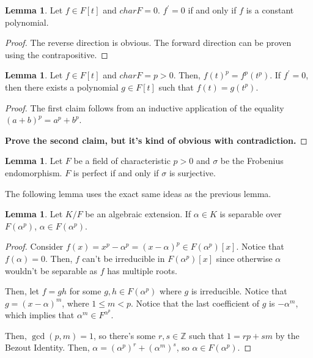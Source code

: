 \documentclass{article}
\theoremstyle{definition}
\newtheorem{lemma}[theorem]{Lemma}
\newcommand{\Z}{\mathbb{Z}}
\begin{document}
\begin{lemma}
    Let $f \in F[t]$ and $charF = 0$. $f^{\prime} = 0$ if and only if $f$ is a constant polynomial.
\end{lemma}
\begin{proof}
    The reverse direction is obvious. The forward direction can be proven using the contrapositive.
\end{proof}

\begin{lemma}
    Let $f \in F[t]$ and $charF = p > 0$. Then, $f(t)^{p} = f^{p}(t^{p})$.
    If $f^{\prime} = 0$, then there exists a polynomial $g \in F[t]$ such that $f(t) = g(t^{p})$.
\end{lemma}
\begin{proof}
    The first claim follows from an inductive application of 
    the equality $(a+b)^{p} = a^{p} + b^{p}$.

    \textbf{Prove the second claim, but it's kind of obvious with contradiction.}
\end{proof}

\begin{lemma}\label{characterization_of_perfect_fields_of_characteristic_p}
    Let $F$ be a field of characteristic $p > 0$ and $\sigma$ be the Frobenius endomorphism.
    $F$ is perfect if and only if $\sigma$ is surjective.
\end{lemma}

The following lemma uses the exact same ideas as the previous lemma.

\begin{lemma}\label{idk_what_to_call_this}
    Let $K/F$ be an algebraic extension. If $\alpha \in K$ is separable over $F(\alpha^{p})$,
    $\alpha \in F(\alpha^{p})$.
\end{lemma}
\begin{proof}
    Consider $f(x) = x^{p} - \alpha^{p} = {(x - \alpha)}^{p} \in F(\alpha^{p})[x]$. Notice that $f(\alpha) = 0$.
    Then, $f$ can't be irreducible in $F(\alpha^{p})[x]$ since otherwise $\alpha$ wouldn't be separable as $f$
    has multiple roots.

    Then, let $f = gh$ for some $g,h \in F(\alpha^{p})$ where $g$ is irreducible. Notice that $g = {(x - \alpha)}^{m}$,
    where $1 \leq m < p$. Notice that the last coefficient of $g$ is $-\alpha^{m}$, which implies that $\alpha^{m} \in F^{\alpha^{p}}$.
    
    Then, $\gcd(p,m) = 1$, so there's some $r,s \in \Z$ such that $1 = rp + sm$ by the Bezout Identity. Then, $\alpha = {(\alpha^{p})}^{r} + 
    {(\alpha^{m})}^{s}$, so $\alpha \in F({\alpha^{p}})$.
\end{proof}
\end{document}
